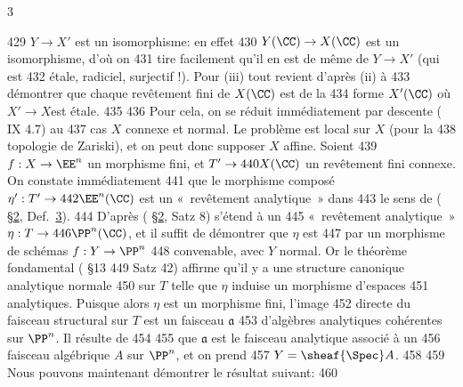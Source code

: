 3	\documentclass[10pt]{../fichiers-configuration-latex/smfart}
\begin{document}
   429	$Y\rightarrow X'$ est un isomorphisme: en effet
   430	$Y(\CC)\rightarrow X(\CC)$ est un isomorphisme, d'où on
   431	tire facilement qu'il en est de même de $Y\rightarrow X'$ (qui est
   432	étale, radiciel, surjectif !). Pour (iii) tout revient d'après (ii) à
   433	démontrer que chaque revêtement fini de $X(\CC)$ est de la
   434	forme $X'(\CC)$ où  $X'\rightarrow X$\pageoriginale est étale.
   435	
   436	Pour cela, on se réduit immédiatement par descente ( IX 4.7) au %
   437	cas $X$ connexe et normal. Le problème est local sur $X$ (pour la
   438	topologie de Zariski), et on peut donc supposer $X$ affine. Soient
   439	$f:X\rightarrow \EE^n$ un morphisme fini, et $T'\rightarrow
   440	X(\CC)$ un revêtement fini connexe. On constate immédiatement
   441	que le morphisme composé $\eta':T'\rightarrow
   442	\EE^n(\CC)$ est un « revêtement analytique » dans
   443	le sens de (\cite{2} \S \hyperref[XI.sec2]{2}, Def.~\hyperref[XI.sec3]{3}). 
   444	D'après (\cite{2} \S \hyperref[XI.sec2]{2}, Satz 8)  s'étend à un
   445	« revêtement analytique » $\eta:T\rightarrow
   446	\PP^n(\CC)$, et il suffit de démontrer que $\eta$ est
   447	 par un morphisme de schémas $f:Y\rightarrow \PP^n$
   448	convenable, avec $Y$ normal. Or le théorème fondamental (\cite{2} \S 13
   449	Satz 42) affirme qu'il y a une structure canonique analytique normale
   450	sur $T$ telle que $\eta$ induise un morphisme d'espaces
   451	analytiques. Puisque alors $\eta$ est un morphisme fini, l'image
   452	directe du faisceau structural sur $T$ est un faisceau $\mathfrak{a}$
   453	d'algèbres analytiques cohérentes sur $\PP^n$. Il résulte de
   454	 \cite{4} %
   455	que $\mathfrak{a}$ est le faisceau analytique associé à un
   456	faisceau algébrique $A$ sur $\PP^n$, et on prend
   457	$Y=\sheaf{\Spec}A$.
   458	
   459	Nous pouvons maintenant démontrer le résultat suivant:
   460	
\end{document}
